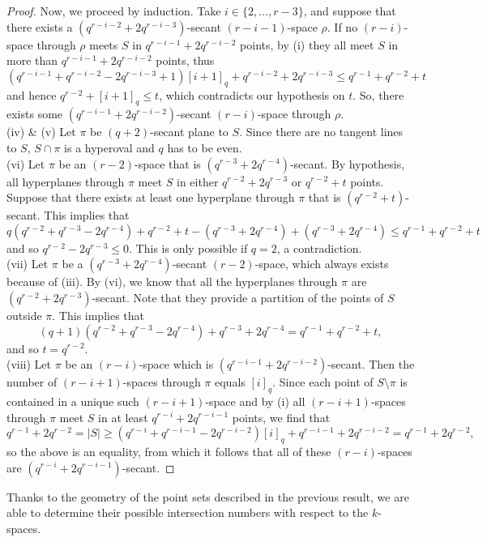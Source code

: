 \documentclass[11pt]{amsart}
\begin{document}
\begin{proof}
Now, we proceed by induction. 
Take $i \in \{2,\ldots,r-3\}$, and suppose that there exists a $(q^{r-i-2}+2q^{r-i-3})$-secant $(r-i-1)$-space $\rho$.
If no $(r-i)$-space through $\rho$ meets $S$ in $q^{r-i-1}+2q^{r-i-2}$ points, by (i) they all meet $S$ in more than $q^{r-i-1}+2q^{r-i-2}$ points, thus
\[
(q^{r-i-1}+q^{r-i-2}-2q^{r-i-3}+1)[i+1]_q+q^{r-i-2}+2q^{r-i-3} \leq q^{r-1}+q^{r-2}+t
\]
and hence $q^{r-2}+[i+1]_q \leq t$, which contradicts our hypothesis on $t$. 
So, there exists some $(q^{r-i-1}+2q^{r-i-2})$-secant $(r-i)$-space through $\rho$.\\
(iv) \& (v) Let $\pi$ be $(q+2)$-secant plane to $S$.
Since there are no tangent lines to $S$, $S\cap \pi$ is a hyperoval and $q$ has to be even.\\
(vi) Let $\pi$ be an $(r-2)$-space that is $(q^{r-3}+2q^{r-4})$-secant. By hypothesis, all hyperplanes through $\pi$ meet $S$ in either $q^{r-2}+2q^{r-3}$ or $q^{r-2}+t$ points. Suppose that there exists at least one hyperplane through $\pi$ that is $(q^{r-2}+t)$-secant. 
This implies that
\[
q(q^{r-2}+q^{r-3}-2q^{r-4})+q^{r-2}+t-(q^{r-3}+2q^{r-4})+(q^{r-3}+2q^{r-4}) \leq q^{r-1}+q^{r-2}+t
\]
and so $q^{r-2}-2q^{r-3} \leq 0$.
This is only possible if $q=2$, a contradiction. \\
(vii) Let $\pi$ be a $(q^{r-3}+2q^{r-4})$-secant $(r-2)$-space, which always exists because of (iii).
By (vi), we know that all the hyperplanes through $\pi$ are $(q^{r-2}+2q^{r-3})$-secant.
Note that they provide a partition of the points of $S$ outside $\pi$.
This implies that
\[
(q+1)(q^{r-2}+q^{r-3}-2q^{r-4})+q^{r-3}+2q^{r-4}= q^{r-1}+q^{r-2}+t,
\]
and so $t=q^{r-2}$. \\
(viii) Let $\pi$ be an $(r-i)$-space which is $(q^{r-i-1}+2q^{r-i-2})$-secant.
Then the number of $(r-i+1)$-spaces through $\pi$ equals $[i]_q$.
Since each point of $S \setminus \pi$ is contained in a unique such $(r-i+1)$-space and by (i) all $(r-i+1)$-spaces through $\pi$ meet $S$ in at least $q^{r-i}+2q^{r-i-1}$ points, we find that
\[
q^{r-1}+2q^{r-2}=|S| \geq (q^{r-i}+q^{r-i-1}-2q^{r-i-2})[i]_q+q^{r-i-1}+2q^{r-i-2} = q^{r-1}+2q^{r-2},
\]
so the above is an equality, from which it follows that all of these $(r-i)$-spaces are $(q^{r-i}+2q^{r-i-1})$-secant.
\end{proof}

Thanks to the geometry of the point sets described in the previous result, we are able to determine their possible intersection numbers with respect to the $k$-spaces.
\end{document}

